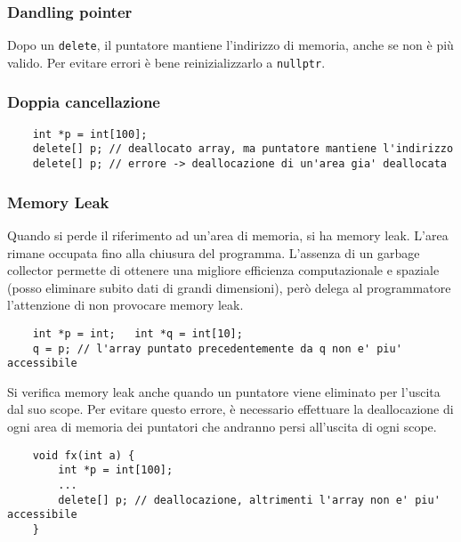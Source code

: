 \documentclass[a4paper]{article}
\begin{document}
\subsubsection*{Dandling pointer}
Dopo un \verb|delete|, il puntatore mantiene l'indirizzo di memoria, anche se non è più valido. Per evitare errori è bene
reinizializzarlo a \verb|nullptr|.

\subsubsection*{Doppia cancellazione}
\begin{lstlisting}
	int *p = int[100];
	delete[] p; // deallocato array, ma puntatore mantiene l'indirizzo
	delete[] p; // errore -> deallocazione di un'area gia' deallocata
\end{lstlisting}

\subsubsection*{Memory Leak}
Quando si perde il riferimento ad un'area di memoria, si ha memory leak. L'area rimane occupata fino alla chiusura del programma.
L'assenza di un garbage collector permette di ottenere una migliore efficienza computazionale e spaziale (posso eliminare subito
dati di grandi dimensioni), però delega al programmatore l'attenzione di non provocare memory leak.
\begin{lstlisting}
	int *p = int;   int *q = int[10];
	q = p; // l'array puntato precedentemente da q non e' piu' accessibile
\end{lstlisting}
Si verifica memory leak anche quando un puntatore viene eliminato per l'uscita dal suo scope. Per evitare questo errore, è
necessario effettuare la deallocazione di ogni area di memoria dei puntatori che andranno persi all'uscita di ogni scope.
\begin{lstlisting}
	void fx(int a) {
		int *p = int[100];
		...
		delete[] p; // deallocazione, altrimenti l'array non e' piu' accessibile
	}
\end{lstlisting}
\end{document}
